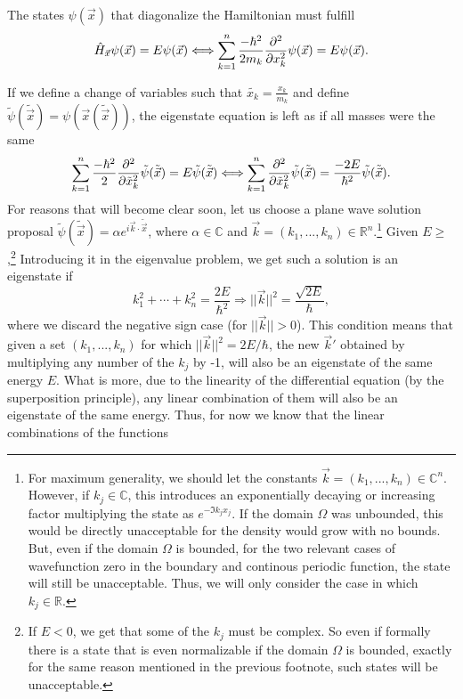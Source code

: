 \documentclass[11pt, a4paper]{article} %
\newcommand{\R}{\mathbb{R}} %
\newcommand{\C}{\mathbb{C}}
\DeclareRobustCommand{\mybox}[2][gray!10]{%
\begin{tcolorbox}[   %
        left=0.2cm,
        right=0.2cm,
        top=0.15cm,
        bottom=0.15cm,
        colback=#1,
        colframe=#1,
        width=\dimexpr\textwidth\relax, 
        enlarge left by=0mm,
        boxsep=5pt,
        arc=0pt,outer arc=0pt,
        ]
        #2
\end{tcolorbox}
}
\begin{document}
The states $\psi(\vec{x})$ that diagonalize the Hamiltonian must fulfill 
\begin{equation}
\hat{H}_{\vec{x}}\psi(\vec{x})=E\psi(\vec{x})\Longleftrightarrow \sum_{k=1}^n\frac{-\hbar^2}{2m_k}\pdv[2]{}{x_k}\psi(\vec{x}) = E\psi(\vec{x}).
\end{equation}
\mybox{
If we define a change of variables such that $\tilde{x_k}=\frac{x_k}{m_k}$ and define $\tilde{\psi}(\tilde{\vec{x}})=\psi(\vec{x}(\tilde{\vec{x}}))$, the eigenstate equation is left as if all masses were the same
\begin{equation}
\sum_{k=1}^n\frac{-\hbar^2}{2}\pdv[2]{}{\tilde{x}_k}\tilde{\psi}(\tilde{\vec{x}}) = E\tilde{\psi}(\tilde{\vec{x}})\Longleftrightarrow \sum_{k=1}^n\pdv[2]{}{\tilde{x}_k}\tilde{\psi}(\tilde{\vec{x}}) = \frac{-2E}{\hbar^2}\tilde{\psi}(\tilde{\vec{x}}).
\end{equation}
For reasons that will become clear soon, let us choose a plane wave solution proposal $\tilde{\psi}(\tilde{\vec{x}})=\alpha e^{i\vec{k}\cdot\tilde{\vec{x}}}$, where $\alpha\in\C$ and $\vec{k}=(k_1,...,k_n)\in\R^n$.\footnote{For maximum generality, we should let the constants $\vec{k}=(k_1,...,k_n)\in\C^n$. However, if $k_j\in\C$, this introduces an exponentially decaying or increasing factor multiplying the state as $e^{-\Im{k_j}x_j}$. If the domain $\Omega$ was unbounded, this would be directly unacceptable for the density would grow with no bounds. But, even if the domain $\Omega$ is bounded, for the two relevant cases of wavefunction zero in the boundary and continous periodic function, the state will still be unacceptable. Thus, we will only consider the case in which $k_j\in\R$.} Given $E\geq$,\footnote{If $E<0$, we get that some of the $k_j$ must be complex. So even if formally there is a state that is even normalizable if the domain $\Omega$ is bounded, exactly for the same reason mentioned in the previous footnote, such states will be unacceptable.} Introducing it in the eigenvalue problem, we get such a solution is an eigenstate if
\begin{equation}
k_1^2+\cdots+k_n^2=\frac{2E}{\hbar^2}\Rightarrow ||\vec{k}||^2= \frac{\sqrt{2E}}{\hbar},
\end{equation}
where we discard the negative sign case (for $||\vec{k}||>0$). This condition means that given a set $(k_1,...,k_n)$ for which $||\vec{k}||^2=2E/\hbar$, the new $\vec{k}'$ obtained by multiplying any number of the $k_j$ by -1, will also be an eigenstate of the same energy $E$. What is more, due to the linearity of the differential equation (by the superposition principle), any linear combination of them will also be an eigenstate of the same energy. Thus, for now we know that the linear combinations of the functions
}
\end{document}
